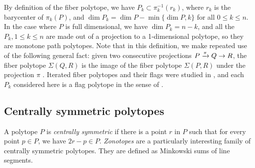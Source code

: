 By definition of the fiber polytope, we have $P_k \subset \pi_k^{-1}(r_k)$, where $r_k$ is the barycenter of $\pi_k(P)$, and $\dim P_k = \dim P - \min\{ \dim P,k\}$ for all $0\leq k \leq n$.
In the case where $P$ is full dimensional, we have $\dim P_k = n-k$, and all the $P_k, 1 \leq k \leq n$ are made out of a projection to a 1-dimensional polytope, so they are monotone path polytopes.
Note that in this definition, we make repeated use of the following general fact: given two consecutive projections $P \xrightarrow{\pi} Q \to R$, the fiber polytope $\Sigma(Q,R)$ is the image of the fiber polytope $\Sigma(P,R)$ under the projection $\pi$ \cite[Lemma 2.3]{BilleraSturmfels92}.
Iterated fiber polytopes and their flags were studied in \cite{BilleraSturmfels94}, and each $P_k$ considered here is a flag polytope in the sense of \cite[Section 3]{BilleraSturmfels94}.







\subsection{Centrally symmetric polytopes} \label{ss:centrally-symmetric}

A polytope $P$ is \emph{centrally symmetric} if there is a point $r$ in $P$ such that for every point $p \in P$, we have $2r-p \in P$.
\emph{Zonotopes} are a particularly interesting family of centrally symmetric polytopes. 
They are defined as Minkowski sums of line segments. 

